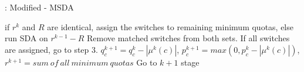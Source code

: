 \documentclass{article}
\begin{document}
	\begin{algorithm}
		\caption{: Modified - MSDA}\label{algo:msda}
		\begin{algorithmic}[1]
			\State if $r^k$ and $R$ are identical, assign the switches to remaining minimum quotas, else run SDA on $r^{k-1}-R$
			\State Remove matched switches from both sets. If all switches are assigned, go to step 3.
			\State $q_c^{k+1} = q_c^k - |\mu^k(c)|$, $p_c^{k+1} = max(0, p_c^k - |\mu^k(c)|)$, $r^{k+1}=sum~of~all~minimum~quotas$
			\State Go to $k+1$ stage
		\end{algorithmic}
	\end{algorithm}
	
	
	
	
\end{document}
